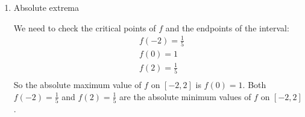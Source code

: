 \documentclass[nooutcomes]{ximera}
\begin{document}
\begin{problem}
\begin{enumerate}
	\item  Absolute extrema
	
		\begin{freeResponse}
		We need to check the critical points of $f$ and the endpoints of the interval:
		\begin{align*}
  		& f(-2)=\frac{1}{5} \\ 
 		& f(0)=1 \\ 
 		& f(2)=\frac{1}{5} \\ 
		\end{align*}
		So the absolute maximum value of $f$ on $[-2,2]$ is $f(0)=1$.  Both $f(-2)=\frac{1}{5}$ and $f(2)=\frac{1}{5}$ are the absolute minimum values of $f$ on $[-2,2]$.
		\end{freeResponse}
	
	\end{enumerate}
		
\end{problem}







	
	
	
	
	
	
	
	
	

	










								
				
				
	
\end{document}
